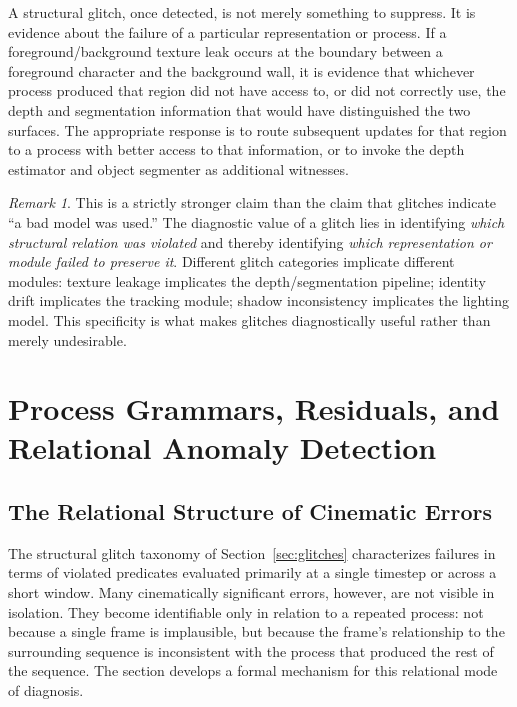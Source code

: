 \documentclass[11pt,a4paper]{article}
\theoremstyle{plain}
\theoremstyle{definition}
\theoremstyle{remark}
\newtheorem{remark}[theorem]{Remark}
\begin{document}
A structural glitch, once detected, is not merely something to suppress. It is evidence about the failure of a particular representation or process. If a foreground/background texture leak occurs at the boundary between a foreground character and the background wall, it is evidence that whichever process produced that region did not have access to, or did not correctly use, the depth and segmentation information that would have distinguished the two surfaces. The appropriate response is to route subsequent updates for that region to a process with better access to that information, or to invoke the depth estimator and object segmenter as additional witnesses.

\begin{remark}
This is a strictly stronger claim than the claim that glitches indicate ``a bad model was used.'' The diagnostic value of a glitch lies in identifying \textit{which structural relation was violated} and thereby identifying \textit{which representation or module failed to preserve it}. Different glitch categories implicate different modules: texture leakage implicates the depth/segmentation pipeline; identity drift implicates the tracking module; shadow inconsistency implicates the lighting model. This specificity is what makes glitches diagnostically useful rather than merely undesirable.
\end{remark}

\section{Process Grammars, Residuals, and Relational Anomaly Detection}
\label{sec:grammars}

\subsection{The Relational Structure of Cinematic Errors}

The structural glitch taxonomy of Section~\ref{sec:glitches} characterizes failures in terms of violated predicates evaluated primarily at a single timestep or across a short window. Many cinematically significant errors, however, are not visible in isolation. They become identifiable only in relation to a repeated process: not because a single frame is implausible, but because the frame's relationship to the surrounding sequence is inconsistent with the process that produced the rest of the sequence. The section develops a formal mechanism for this relational mode of diagnosis.
\end{document}
